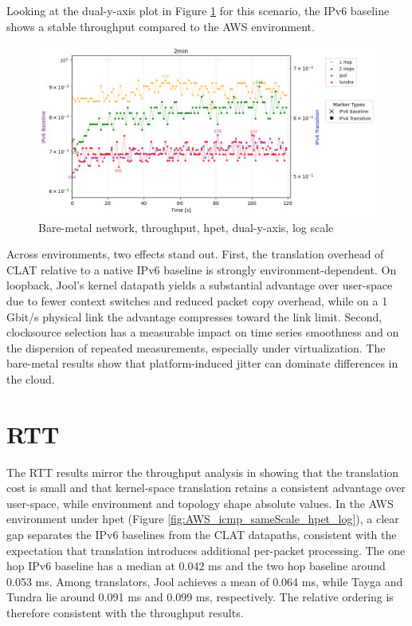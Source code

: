 Looking at the dual-y-axis plot in Figure \ref{fig:Double_tcp_dualAxis_hpet_log} for this scenario, the IPv6 baseline shows a stable throughput compared to the AWS environment.
\begin{figure}[H]
    \centering
    \includegraphics[width=1\textwidth]{resources/finalPlots/Jitterplots/LocalDouble_tcp_dualAxis_hpet_2min_log.png}
    \caption{Bare-metal network, throughput, hpet, dual-y-axis, log scale}
    \label{fig:Double_tcp_dualAxis_hpet_log}
\end{figure}

Across environments, two effects stand out. First, the translation overhead of CLAT relative to a native IPv6 baseline is strongly environment-dependent. On loopback, Jool’s kernel datapath yields a substantial advantage over user-space due to fewer context switches and reduced packet copy overhead, while on a 1 Gbit/s physical link the advantage compresses toward the link limit. Second, clocksource selection has a measurable impact on time series smoothness and on the dispersion of repeated measurements, especially under virtualization. The bare-metal results show that platform-induced jitter can dominate differences in the cloud.

\section{RTT}
The RTT results mirror the throughput analysis in showing that the translation cost is small and that kernel-space translation retains a consistent advantage over user-space, while environment and topology shape absolute values. In the AWS environment under hpet (Figure \ref{fig:AWS_icmp_sameScale_hpet_log}), a clear gap separates the IPv6 baselines from the CLAT datapaths, consistent with the expectation that translation introduces additional per-packet processing. The one hop IPv6 baseline has a median at 0.042 ms and the two hop baseline around 0.053 ms. Among translators, Jool achieves a mean of 0.064 ms, while Tayga and Tundra lie around 0.091 ms and 0.099 ms, respectively. The relative ordering is therefore consistent with the throughput results.


